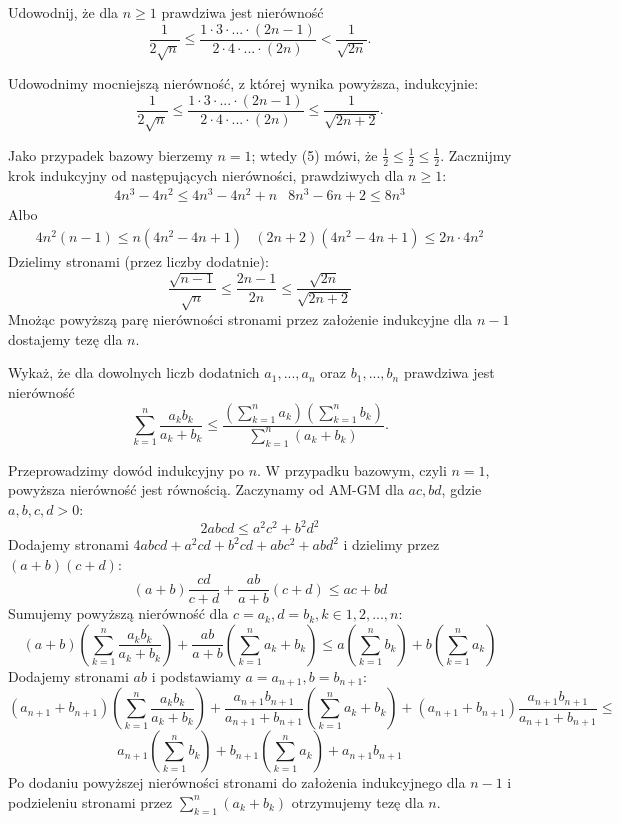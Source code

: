 \documentclass{../note}
\begin{document}
\begin{zadanie}{5}
Udowodnij, że dla $n\ge1$ prawdziwa jest nierówność
\[\frac{1}{2\sqrt{n}}\le\frac{1\cdot3\cdot...\cdot(2n-1)}{2\cdot4\cdot...\cdot(2n)}<\frac{1}{\sqrt{2n}}.\]
\end{zadanie}
\begin{rozwiazanie}
Udowodnimy mocniejszą nierówność, z której wynika powyższa, indukcyjnie:
\begin{equation}
\frac{1}{2\sqrt{n}}\le\frac{1\cdot3\cdot...\cdot(2n-1)}{2\cdot4\cdot...\cdot(2n)}\leq\frac{1}{\sqrt{2n+2}}.
\end{equation}
\end{rozwiazanie}
Jako przypadek bazowy bierzemy $n = 1$; wtedy (5) mówi, że $\frac12 \leq \frac12 \leq \frac12$.
Zacznijmy krok indukcyjny od następujących nierówności, prawdziwych dla $n \geq 1$:
\begin{align*}
4n^3 - 4n^2 \leq 4n^3 - 4n^2 + n & 8n^3 - 6n + 2 \leq 8n^3
\end{align*}
Albo
\begin{align*}
4n^2(n-1) \leq n(4n^2 - 4n + 1) & (2n+2)(4n^2-4n+1) \leq 2n \cdot 4n^2
\end{align*}
Dzielimy stronami (przez liczby dodatnie):
\[\frac{\sqrt{n-1}}{\sqrt{n}} \leq \frac{2n-1}{2n} \leq \frac{\sqrt{2n}}{\sqrt{2n+2}}\]
Mnożąc powyższą parę nierówności stronami przez założenie indukcyjne dla $n-1$ dostajemy tezę dla $n$.

\begin{zadanie}{6}
Wykaż, że dla dowolnych liczb dodatnich $a_{1},...,a_{n}$ oraz $b_{1},...,b_{n}$ prawdziwa jest nierówność
\[\sum_{k=1}^{n}\frac{a_{k}b_{k}}{a_{k}+b_{k}}\le\frac{\left(\sum_{k=1}^{n}a_{k}\right)\left(\sum_{k=1}^{n}b_{k}\right)}{\sum_{k=1}^{n}(a_{k}+b_{k})}.\]
\end{zadanie}
\begin{rozwiazanie}
Przeprowadzimy dowód indukcyjny po $n$. W przypadku bazowym, czyli $n=1$, powyższa nierówność jest równością. Zaczynamy od AM-GM dla $ac, bd$, gdzie $a, b, c, d > 0$:
\[2abcd \leq a^2c^2 + b^2d^2\]
Dodajemy stronami $4abcd + a^2cd + b^2cd + abc^2 + abd^2$ i dzielimy przez $(a + b)(c + d)$:
\[(a + b)\frac{cd}{c+d} + \frac{ab}{a+b}(c+d) \leq ac + bd\]
Sumujemy powyższą nierówność dla $c = a_k, d = b_k, k \in {1, 2, ..., n}$:
\[(a + b)\left(\sum_{k=1}^{n} \frac{a_kb_k}{a_k + b_k}\right) + \frac{ab}{a+b}\left(\sum_{k=1}^{n} a_k + b_k\right) \leq a\left(\sum_{k=1}^{n} b_k\right) + b\left(\sum_{k=1}^{n} a_k\right)\]
Dodajemy stronami $ab$ i podstawiamy $a = a_{n+1}, b=b_{n+1}$:
\[(a_{n+1} + b_{n+1})\left(\sum_{k=1}^{n} \frac{a_kb_k}{a_k + b_k}\right) + \frac{a_{n+1}b_{n+1}}{a_{n+1}+b_{n+1}}\left(\sum_{k=1}^{n} a_k + b_k\right) + (a_{n+1} + b_{n+1})\frac{a_{n+1}b_{n+1}}{a_{n+1} + b_{n+1}} \leq\]
\[a_{n+1}\left(\sum_{k=1}^{n} b_k\right) + b_{n+1}\left(\sum_{k=1}^{n} a_k\right) + a_{n+1}b_{n+1}\]
Po dodaniu powyższej nierówności stronami do założenia indukcyjnego dla $n-1$ i podzieleniu stronami przez $\sum_{k=1}^{n}(a_{k}+b_{k})$ otrzymujemy tezę dla $n$.
\end{rozwiazanie}
\end{document}
